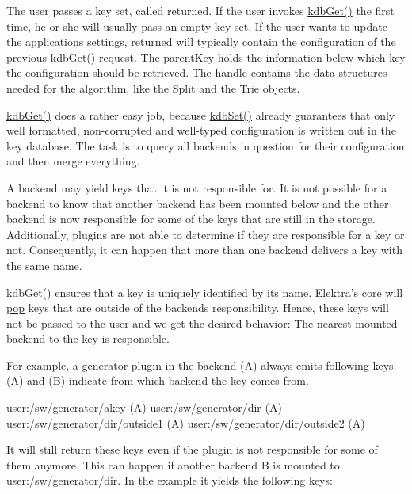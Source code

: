 The user passes a key set, called {\ttfamily returned}. If the user invokes {\ttfamily \hyperlink{group__kdb_ga28e385fd9cb7ccfe0b2f1ed2f62453a1}{kdb\+Get()}} the first time, he or she will usually pass an empty key set. If the user wants to update the application\textquotesingle{}s settings, {\ttfamily returned} will typically contain the configuration of the previous {\ttfamily \hyperlink{group__kdb_ga28e385fd9cb7ccfe0b2f1ed2f62453a1}{kdb\+Get()}} request. The {\ttfamily parent\+Key} holds the information below which key the configuration should be retrieved. The {\ttfamily handle} contains the data structures needed for the algorithm, like the {\ttfamily Split} and the {\ttfamily Trie} objects.

{\ttfamily \hyperlink{group__kdb_ga28e385fd9cb7ccfe0b2f1ed2f62453a1}{kdb\+Get()}} does a rather easy job, because {\ttfamily \hyperlink{group__kdb_ga11436b058408f83d303ca5e996832bcf}{kdb\+Set()}} already guarantees that only well formatted, non-\/corrupted and well-\/typed configuration is written out in the key database. The task is to query all backends in question for their configuration and then merge everything.

A backend may yield keys that it is not responsible for. It is not possible for a backend to know that another backend has been mounted below and the other backend is now responsible for some of the keys that are still in the storage. Additionally, plugins are not able to determine if they are responsible for a key or not. Consequently, it can happen that more than one backend delivers a key with the same name.

{\ttfamily \hyperlink{group__kdb_ga28e385fd9cb7ccfe0b2f1ed2f62453a1}{kdb\+Get()}} ensures that a key is uniquely identified by its name. Elektra’s core will \hyperlink{doc_help_elektra-glossary_md}{pop} keys that are outside of the backend\textquotesingle{}s responsibility. Hence, these keys will not be passed to the user and we get the desired behavior\+: The nearest mounted backend to the key is responsible.

For example, a generator plugin in the backend (A) always emits following keys. (A) and (B) indicate from which backend the key comes from.


\begin{DoxyCode}
user:/sw/generator/akey (A)
user:/sw/generator/dir (A)
user:/sw/generator/dir/outside1 (A)
user:/sw/generator/dir/outside2 (A)
\end{DoxyCode}


It will still return these keys even if the plugin is not responsible for some of them anymore. This can happen if another backend B is mounted to {\ttfamily user\+:/sw/generator/dir}. In the example it yields the following keys\+:


